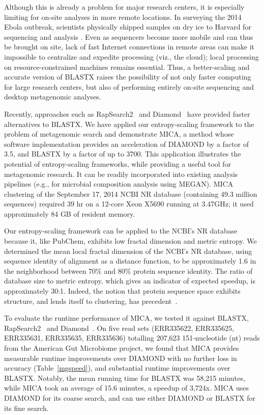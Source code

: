 \documentclass[review,preprint,12pt]{elsarticle}
\renewcommand{\cite}{\citep} %
\theoremstyle{definition}
\theoremstyle{remark}
\numberwithin{equation}{section}
\begin{document}
Although this is already a problem for major research centers, it is especially
limiting for on-site analyses in more remote locations.
In surveying the 2014 Ebola outbreak, scientists physically shipped samples on 
dry ice to Harvard for sequencing and analysis \cite{gire2014genomic}.
Even as sequencers become more mobile and can thus be brought on site, lack of fast Internet connections in remote
areas can make it impossible to centralize and expedite processing (viz., the cloud);
local processing on resource-constrained machines remains essential.
Thus, a better-scaling and accurate version of BLASTX raises the possibility of 
not only faster computing for large research centers, but also of performing
entirely on-site sequencing and desktop metagenomic analyses.

Recently, approaches such as RapSearch2~\cite{zhao2012rapsearch2} and 
Diamond~\cite{buchfink2014fast} have provided faster alternatives to BLASTX.
We have applied our entropy-scaling framework to the problem of 
metagenomic search and demonstrate MICA, a method whose software 
implementation provides an acceleration of DIAMOND by a factor of 3.5, and 
BLASTX by a factor of up to 3700.
This application illustrates the potential of entropy-scaling frameworks, while
providing a useful tool for metagenomic research.
It can be readily incorporated into existing analysis pipelines (e.g., for microbial 
composition analysis using MEGAN).
MICA clustering of the September 17, 2014 NCBI NR database (containing 49.3 million sequences) required 39 
hr on a 12-core Xeon X5690 running at 3.47GHz; it used approximately 84 GB of resident memory.

Our entropy-scaling framework can be applied to the NCBI's NR database because it, 
like PubChem, exhibits low fractal dimension and metric entropy.
We determined the mean local fractal dimension of the NCBI's NR database, using 
sequence identity of alignment as a distance function, to be approximately 1.6 
in the neighborhood between 70\% and 80\% protein sequence identity.
The ratio of database size to metric entropy, which gives an indicator of expected speedup,
is approximately 30:1.
Indeed, the notion that protein sequence space exhibits structure, 
and lends itself to clustering, has precedent~\cite{linial1997global}.

To evaluate the runtime performance of MICA, we tested it against
BLASTX, RapSearch2~\cite{zhao2012rapsearch2} and 
Diamond~\cite{buchfink2014fast}.
On five read sets (ERR335622, ERR335625, ERR335631, ERR335635, ERR335636) totalling 207,623 151-nucleotide (nt) reads from 
the American Gut Microbiome project, we found that MICA provides 
measurable runtime improvements over DIAMOND with no further loss in accuracy 
(Table~\ref{mgspeed}), and substantial runtime improvements over BLASTX.
Notably, the mean running time for BLASTX was 58,215 minutes, 
while MICA took an average of 15.6 minutes, a speedup of 3,724x.
MICA uses DIAMOND for its coarse search, and can use either DIAMOND or BLASTX
for its fine search.
\end{document}
